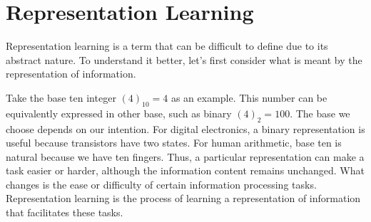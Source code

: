 \documentclass[../../thesis.tex]{subfiles}
\begin{document}









\section{Representation Learning}

Representation learning is a term that can be difficult to define due to its abstract nature. To understand it better, let's first consider what is meant by the representation of information.\newline

Take the base ten integer $(4)_{10}= 4$ as an example. This number can be equivalently expressed in other base, such as binary $(4)_{2}=100$. The base we choose depends on our intention. For digital electronics, a binary representation is useful because transistors have two states. For human arithmetic, base ten is natural because we have ten fingers. Thus, a particular representation can make a task easier or harder, although the information content remains unchanged. What changes is the ease or difficulty of certain information processing tasks. Representation learning is the process of learning a representation of information that facilitates these tasks.\newline
\end{document}
